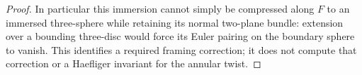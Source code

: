 \begin{proof}
In particular this immersion cannot simply be compressed along
\(F\) to an immersed three-sphere while retaining its normal
two-plane bundle: extension over a bounding three-disc would force
its Euler pairing on the boundary sphere to vanish. This identifies
a required framing correction; it does not compute that correction
or a Haefliger invariant for the annular twist.
\end{proof}
